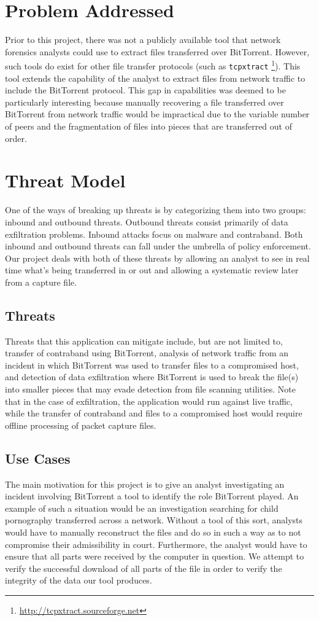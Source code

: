 \documentclass{acm_proc_article-sp}
\begin{document}
\section{Problem Addressed}
Prior to this project, there was not a publicly available tool that network
forensics analysts could use to extract files transferred over BitTorrent.
However, such tools do exist for other file transfer protocols (such as
\texttt{tcpxtract} \footnote{\url{http://tcpxtract.sourceforge.net}}). This tool
extends the capability of the analyst to extract files from network traffic to
include the BitTorrent protocol. This gap in capabilities was deemed to be
particularly interesting because manually recovering a file transferred over
BitTorrent from network traffic would be impractical due to the variable number
of peers and the fragmentation of files into pieces that are transferred out of
order.

\section{Threat Model}
One of the ways of breaking up threats is by categorizing them into two groups:
inbound and outbound threats.  Outbound threats consist primarily of data
exfiltration problems.  Inbound attacks focus on malware and contraband. Both
inbound and outbound threats can fall under the umbrella of policy enforcement.
Our project deals with both of these threats by allowing an analyst to see in
real time what's being transferred in or out and allowing a systematic review
later from a capture file.

\subsection{Threats}
Threats that this application can mitigate include, but are not limited to,
transfer of contraband using BitTorrent, analysis of network traffic from an
incident in which BitTorrent was used to transfer files to a compromised host,
and detection of data exfiltration where BitTorrent is used to break the file(s)
into smaller pieces that may evade detection from file scanning utilities. Note
that in the case of exfiltration, the application would run against live
traffic, while the transfer of contraband and files to a compromised host would
require offline processing of packet capture files.

\subsection{Use Cases}
The main motivation for this project is to give an analyst investigating an
incident involving BitTorrent a tool to identify the role BitTorrent played.  An
example of such a situation would be an investigation searching for child
pornography transferred across a network. Without a tool of this sort, analysts
would have to manually reconstruct the files and do so in such a way as to not
compromise their admissibility in court. Furthermore, the analyst would have to
ensure that all parts were received by the computer in question. We attempt to
verify the successful download of all parts of the file in order to verify the
integrity of the data our tool produces.
\end{document}
